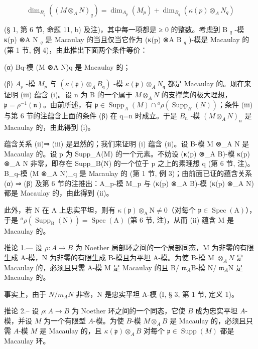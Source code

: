 \[
\dim_ {B _ {q}} \left(\left(M \otimes_ {A} N\right) _ {q}\right) = \dim_ {A _ {p}} \left(M _ {p}\right) + \dim_ {B _ {q}} \left(\kappa (p) \otimes_ {A} N _ {q}\right)
\]

(§ 1, 第 6 节, 命题 11, b) 及注)，其中每一项都是 ≥ 0 的整数。考虑到 B \(_{q}\) -模 κ(p) ⊗A N \(_{q}\) 是 Macaulay 的当且仅当它作为 (κ(p) ⊗A B \(_{q}\) )-模是 Macaulay 的 (第 1 节, 例 4)，由此推出下面两个条件等价：

(α) Bq-模 (M ⊗A N)q 是 Macaulay 的；

(β) \(A_{p}\) -模 \(M_{p}\) 与 \((\kappa(\mathfrak{p})\otimes_{A}B_{\mathfrak{q}})\) -模 \(\kappa(\mathfrak{p})\otimes_{A}N_{\mathfrak{q}}\) 都是 Macaulay 的。现在来证明 (iii) 蕴含 (i)。设 n 为 B 的一个属于 \(M\otimes_{A}N\) 的支撑集的极大理想，\(\mathfrak{p}=\rho^{-1}(\mathfrak{n})\)。由前所述，有 \(\mathfrak{p}\in\operatorname{Supp}_{A}(M)\cap{}^{a}\rho(\operatorname{Supp}_{B}(N))\)；条件 (iii) 与第 6 节的注蕴含上面的条件 (β) 在 q=n 时成立。于是 \(B_{n}\) -模 \((M\otimes_{A}N)_{n}\) 是 Macaulay 的，由此得到 (i)。

蕴含关系 (ii)⇒ (iii) 是显然的；我们来证明 (i) 蕴含 (ii)。设 B-模 M ⊗\_A N 是 Macaulay 的。设 p 为 Supp\_A(M) 的一个元素。不妨设 (κ(p) ⊗\_A B)-模 κ(p) ⊗\_A N 非零，即存在 Supp\_B(N) 的一个位于 p 之上的素理想 q (第 6 节, 注)。B\_q-模 (M ⊗\_A N)\_q 是 Macaulay 的 (第 1 节, 例 3)；由前面已证的蕴含关系 (α) ⇒ (β) 及第 6 节的注推出：A\_p-模 M\_p 与 (κ(p) ⊗\_A B)-模 (κ(p) ⊗\_A N) 都是 Macaulay 的，由此得到 (ii)。

此外，若 N 在 A 上忠实平坦，则有 \(\kappa(\mathfrak{p})\otimes_{\mathrm{A}}\mathrm{N}\neq 0\)（对每个 \(\mathfrak{p}\in\operatorname{Spec}(\mathrm{A})\)），于是 \({}^{a}\rho(\operatorname{Supp}_{\mathrm{B}}(\mathrm{N}))=\operatorname{Spec}(\mathrm{A})\) (第 6 节, 注)，从而 (ii) 蕴含 M 是 Macaulay 的。

推论 1.--- 设 \(\rho: A \to B\) 为 Noether 局部环之间的一个局部同态，M 为非零的有限生成 A-模，N 为非零的有限生成 B-模且为平坦 A-模。为使 B-模 M \(\otimes_{A}N\) 是 Macaulay 的，必须且只需 A-模 M 是 Macaulay 的且 B/ \(\mathfrak{m}_{A}\)B-模 N/ \(\mathfrak{m}_{A}\)N 是 Macaulay 的。

事实上，由于 \(N/m_{A}N\) 非零，N 是忠实平坦 A-模 (I, § 3, 第 1 节, 定义 1)。

推论 2.-- 设 \(\rho: A \to B\) 为 Noether 环之间的一个同态，它使 \(B\) 成为忠实平坦 \(A\)-模，并设 \(M\) 为一个有限型 \(A\)-模。为使 \(B\)-模 \(M \otimes_{A} B\) 是 Macaulay 的，必须且只需 \(A\)-模 \(M\) 是 Macaulay 的，且 \(\kappa(\mathfrak{p}) \otimes_{A} B\) 对每个 \(\mathfrak{p} \in \operatorname{Supp}(M)\) 都是 Macaulay 环。

